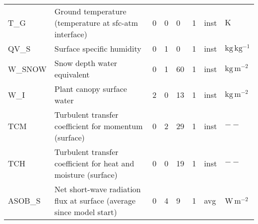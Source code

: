 \begin{longtable}{p{2.0cm}p{5.0cm}p{0.8cm}p{0.8cm}p{0.8cm}p{0.9cm}p{1cm}p{1cm}}
T\_G                           &  Ground temperature (temperature at sfc-atm interface)                                 &               0                                   &                     0                       &                    0                       &                 1                           &                      inst                   &        $\mathrm{K}$    \\
QV\_S                          &  Surface specific humidity                                                             &               0                                   &                     1                       &                    0                       &                 1                           &                      inst                   &        $\mathrm{kg\,kg^{-1}}$    \\
W\_SNOW                        &  Snow depth water equivalent                                                           &               0                                   &                     1                       &                    60                      &                 1                           &                      inst                   &        $\mathrm{kg\,m^{-2}}$    \\
W\_I                           &  Plant canopy surface water                                                            &               2                                   &                     0                       &                    13                      &                 1                           &                      inst                   &        $\mathrm{kg\,m^{-2}}$    \\
TCM                            &  Turbulent transfer coefficient for momentum (surface)                                 &               0                                   &                     2                       &                    29                      &                 1                           &                      inst                   &        $\mathrm{--}$    \\ 
TCH                            &  Turbulent transfer coefficient for heat and moisture (surface)                        &               0                                   &                     0                       &                    19                      &                 1                           &                      inst                   &        $\mathrm{--}$    \\
ASOB\_S                        &  Net short-wave radiation flux at surface (average since model start)                  &               0                                   &                     4                       &                     9                      &                 1                           &                      avg                    &        $\mathrm{W\,m^{-2}}$    \\

\end{longtable}
